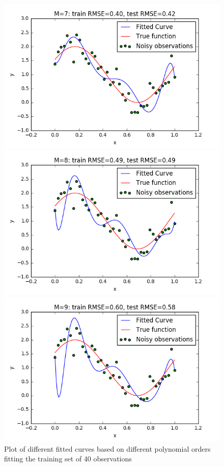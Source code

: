 \documentclass[a4paper]{article}
\begin{document}
\begin{figure}[h!]
\begin{multicols}{2}
    \includegraphics[width=\linewidth]{Images/curvefit_m7_n_40.png}\par
    \includegraphics[width=\linewidth]{Images/curvefit_m8_n_40.png}\par
    \includegraphics[width=\linewidth]{Images/curvefit_m9_n_40.png}\par
\end{multicols}
\label{fig:different-polynomials-rmse-40}
\caption{Plot of different fitted curves based on different polynomial orders fitting the training set of 40 observations}
\end{figure}
\end{document}
